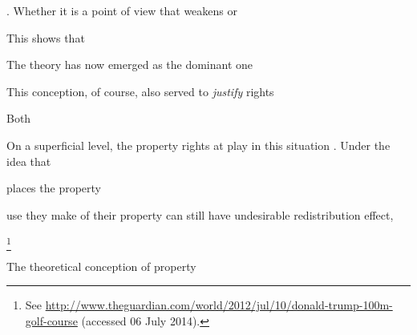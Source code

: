 . Whether it is a point of view that weakens or 


This shows that 

The theory has now emerged as the dominant one


This conception, of course, also served to {\it justify}  rights 

Both 


On a superficial level, the property rights at play in this situation . Under the idea that 

 places the property 

 use they make of their property can still have undesirable redistribution effect, 


\footnote{See \url{http://www.theguardian.com/world/2012/jul/10/donald-trump-100m-golf-course} (accessed 06 July 2014).}

The theoretical conception of property 